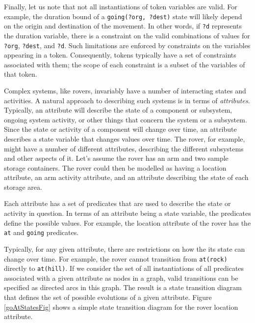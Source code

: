 Finally, let us note that not all instantiations of token variables
are valid.  For example, the duration bound of a {\tt going(?org,
?dest)} state will likely depend on the origin and destination of the
movement.  In other words, if {\tt ?d} represents the duration
variable, there is a constraint on the valid combinations of values
for {\tt ?org}, {\tt ?dest}, and {\tt ?d}.  Such limitations are
enforced by constraints on the variables appearing in a token. 
Consequently, tokens typically have a set of constraints associated
with them; the scope of each constraint is a subset of the variables
of that token.




Complex systems, like rovers, invariably have a number of interacting
states and activities.  A natural approach to describing such systems
is in terms of {\em attributes}.  Typically, an attribute will
describe the state of a component or subsystem, ongoing system
activity, or other things that concern the system or a subsystem.
Since the state or activity of a component will change over time, an
attribute describes a state variable that changes values over time.
The rover, for example, might have a number of different attributes,
describing the different subsystems and other aspects of it.  Let's
assume the rover has an arm and two sample storage containers.  The
rover could then be modelled as having a location attribute, an arm
activity attribute, and an attribute describing the state of each
storage area.

Each attribute has a set of predicates that are used to describe the
state or activity in question.  In terms of an attribute being a state
variable, the predicates define the possible values.  For example, the
location attribute of the rover has the {\tt at} and {\tt going}
predicates.

Typically, for any given attribute, there are restrictions on how the
its state can change over time.  For example, the rover cannot
transition from {\tt at(rock)} directly to {\tt at(hill)}.  If we
consider the set of all instantiations of all predicates associated
with a given attribute as nodes in a graph, valid transitions can be
specified as directed arcs in this graph.  The result is a state
transition diagram that defines the set of possible evolutions of a
given attribute.  Figure \ref{goAtStatesFig} shows a simple state
transition diagram for the rover location attribute.

